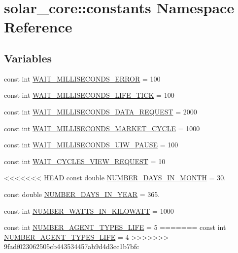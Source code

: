 \hypertarget{namespacesolar__core_1_1constants}{}\section{solar\+\_\+core\+:\+:constants Namespace Reference}
\label{namespacesolar__core_1_1constants}
\subsection*{Variables}
\begin{DoxyCompactItemize}
\item 
const int \hyperlink{namespacesolar__core_1_1constants_a4cddd8d733f9237d6fb56197354fed46}{W\+A\+I\+T\+\_\+\+M\+I\+L\+L\+I\+S\+E\+C\+O\+N\+D\+S\+\_\+\+E\+R\+R\+O\+R} = 100
\item 
const int \hyperlink{namespacesolar__core_1_1constants_ab90981a98985a16f6e239808f36186d7}{W\+A\+I\+T\+\_\+\+M\+I\+L\+L\+I\+S\+E\+C\+O\+N\+D\+S\+\_\+\+L\+I\+F\+E\+\_\+\+T\+I\+C\+K} = 100
\item 
const int \hyperlink{namespacesolar__core_1_1constants_a88d556c323e6871de3313428289b6cb6}{W\+A\+I\+T\+\_\+\+M\+I\+L\+L\+I\+S\+E\+C\+O\+N\+D\+S\+\_\+\+D\+A\+T\+A\+\_\+\+R\+E\+Q\+U\+E\+S\+T} = 2000
\item 
const int \hyperlink{namespacesolar__core_1_1constants_ab3dddf011f92328166c5f93e3951107e}{W\+A\+I\+T\+\_\+\+M\+I\+L\+L\+I\+S\+E\+C\+O\+N\+D\+S\+\_\+\+M\+A\+R\+K\+E\+T\+\_\+\+C\+Y\+C\+L\+E} = 1000
\item 
const int \hyperlink{namespacesolar__core_1_1constants_abebba44aef8bbf544a330b8b20229320}{W\+A\+I\+T\+\_\+\+M\+I\+L\+L\+I\+S\+E\+C\+O\+N\+D\+S\+\_\+\+U\+I\+W\+\_\+\+P\+A\+U\+S\+E} = 100
\item 
const int \hyperlink{namespacesolar__core_1_1constants_ae4d0a481c94f57be3e97f1c8463e631a}{W\+A\+I\+T\+\_\+\+C\+Y\+C\+L\+E\+S\+\_\+\+V\+I\+E\+W\+\_\+\+R\+E\+Q\+U\+E\+S\+T} = 10
\item 
<<<<<<< HEAD
const double \hyperlink{namespacesolar__core_1_1constants_ad1ba09888c65cd255ec5e71f9121b1ed}{N\+U\+M\+B\+E\+R\+\_\+\+D\+A\+Y\+S\+\_\+\+I\+N\+\_\+\+M\+O\+N\+T\+H} = 30.
\item 
const double \hyperlink{namespacesolar__core_1_1constants_ae81a48fc5b3417f74d5fc9b57cb023cd}{N\+U\+M\+B\+E\+R\+\_\+\+D\+A\+Y\+S\+\_\+\+I\+N\+\_\+\+Y\+E\+A\+R} = 365.
\item 
const int \hyperlink{namespacesolar__core_1_1constants_adecfde74aa5d1f05002f04c42035bfd2}{N\+U\+M\+B\+E\+R\+\_\+\+W\+A\+T\+T\+S\+\_\+\+I\+N\+\_\+\+K\+I\+L\+O\+W\+A\+T\+T} = 1000
\item 
const int \hyperlink{namespacesolar__core_1_1constants_a2ec52da705235aa418b0def4e509ef81}{N\+U\+M\+B\+E\+R\+\_\+\+A\+G\+E\+N\+T\+\_\+\+T\+Y\+P\+E\+S\+\_\+\+L\+I\+F\+E} = 5
=======
const int \hyperlink{namespacesolar__core_1_1constants_a2ec52da705235aa418b0def4e509ef81}{N\+U\+M\+B\+E\+R\+\_\+\+A\+G\+E\+N\+T\+\_\+\+T\+Y\+P\+E\+S\+\_\+\+L\+I\+F\+E} = 4
>>>>>>> 9fadf023062505cb443534457ab9d4d3cc1b7bfc
\end{DoxyCompactItemize}


